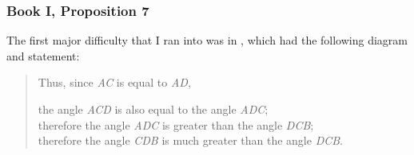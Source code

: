\documentclass{article}
\begin{document}
\subsubsection{Book I, Proposition 7}
The first major difficulty that I ran into was in , which had the following diagram and statement:
\begin{center}
\begin{figure}
\begin{makeimage}
\end{makeimage}
\end{figure}
\end{center}
\begin{quote}
Thus, since \textit{AC} is equal to \textit{AD},
\begin{centering}
the angle \textit{ACD} is also equal to the angle \textit{ADC}; \\
therefore the angle \textit{ADC} is greater than the angle \textit{DCB}; \\
therefore the angle \textit{CDB} is much greater than the angle \textit{DCB}. \\
\end{centering}
\end{quote}
\end{document}
